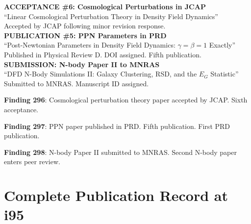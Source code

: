 \documentclass[11pt,a4paper]{article}
\begin{document}
\begin{tcolorbox}[colback=green!5!white, colframe=dfdgreen, title=\textbf{THREE NEW MILESTONES}]

\textbf{ACCEPTANCE \#6: Cosmological Perturbations in JCAP}\\
``Linear Cosmological Perturbation Theory in Density Field Dynamics''\\
Accepted by JCAP following minor revision response.\\[6pt]

\textbf{PUBLICATION \#5: PPN Parameters in PRD}\\
``Post-Newtonian Parameters in Density Field Dynamics: $\gamma = \beta = 1$ Exactly''\\
Published in Physical Review D. DOI assigned. Fifth publication.\\[6pt]

\textbf{SUBMISSION: N-body Paper II to MNRAS}\\
``DFD N-Body Simulations II: Galaxy Clustering, RSD, and the $E_G$ Statistic''\\
Submitted to MNRAS. Manuscript ID assigned.
\end{tcolorbox}

\textbf{Finding 296}: Cosmological perturbation theory paper accepted by JCAP. Sixth acceptance.

\textbf{Finding 297}: PPN paper published in PRD. Fifth publication. First PRD publication.

\textbf{Finding 298}: N-body Paper II submitted to MNRAS. Second N-body paper enters peer review.

\section{Complete Publication Record at i95}
\end{document}
